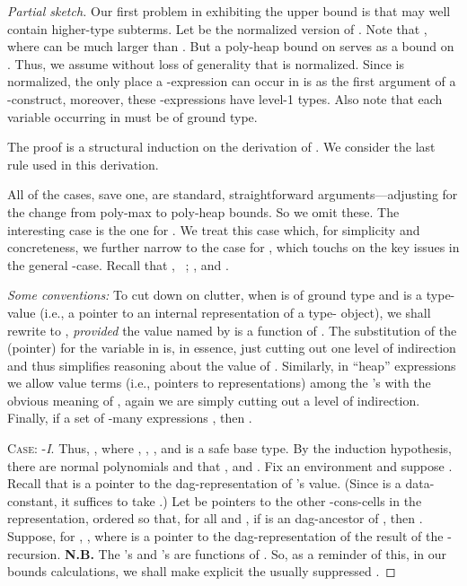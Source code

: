 \documentclass[envcountsame]{llncs}
\begin{document}
\begin{proof}[Partial sketch]
Our first problem in exhibiting the upper bound is that  may well 
contain higher-type subterms.  
Let  be the normalized version of .  Note
that , where  can be much larger
than .  But a poly-heap bound on  serves as a
bound on .  Thus, we assume without loss of generality that
 is normalized.
Since  is normalized, the only place a -expression can 
occur in  is
as the first argument of a -construct, moreover, these
-expressions have level-1 types.
Also note that each variable occurring in  must be of ground type.

The proof is a structural induction on the derivation of 
.  We consider the last rule
used in this derivation.  

All of the cases, save one, are standard, straightforward arguments---adjusting for the change from poly-max to poly-heap 
bounds.  So we omit these. The interesting case is the one for 
.  We treat this case which, for simplicity 
and concreteness, we further narrow to the case for
, which 
touchs on the key issues in the general -case.
Recall that
, \
; 
,
and . 


\emph{Some conventions:}  To cut down on clutter, 
when  is of ground type  and  is a type-
value  (i.e., a pointer to an internal representation of 
a type- object), we shall rewrite 
 to , 
\emph{provided} the value named by  is a function
of .  The substitution of the (pointer)  for
the variable  in  is, in essence, just cutting out
one level of indirection and thus simplifies reasoning about
the value of .
Similarly, in ``heap'' expressions 
we allow value terms (i.e., pointers to representations) 
among the 's with the obvious meaning of 
, again we are simply cutting out a
level of indirection.  Finally, if  a set of -many
expressions , then 
.





\textsc{Case:} -\emph{I}.  
Thus, , where 
, 
, 
, and  is a safe base type.
By the induction hypothesis, there are normal polynomials 
and  that , 
and .  Fix an environment 
and suppose .  Recall that
 is a pointer to the dag-representation of 's value.
(Since  is a data-constant, it suffices to take .) 
Let  be pointers to the other -cons-cells
in the representation, ordered so that, for all  and ,
if  is an dag-ancestor of , then . 
Suppose, for , , where  is a pointer
to the dag-representation of the result of the -recursion. \textbf{N.B.}  The 's and 's are functions
of .  So, as a reminder of this, 
 in our bounds calculations, we shall make explicit
the usually suppressed .



\end{proof}
\end{document}
